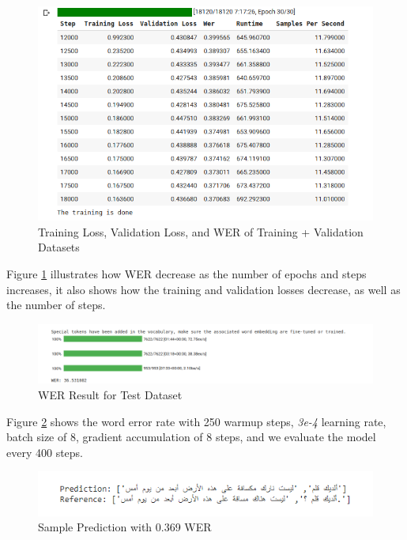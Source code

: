 \documentclass[
  a4paper,
]{article}
\begin{document}
\begin{figure}

{\centering \includegraphics{training_is_done} 

}

\caption{Training Loss, Validation Loss, and WER of Training + Validation Datasets}\label{fig:wer37}
\end{figure}

Figure \ref{fig:wer37} illustrates how WER decrease as the number of
epochs and steps increases, it also shows how the training and
validation losses decrease, as well as the number of steps.

\begin{figure}

{\centering \includegraphics{WER36.53} 

}

\caption{WER Result for Test Dataset}\label{fig:WER36.53}
\end{figure}

Figure \ref{fig:WER36.53} shows the word error rate with 250 warmup
steps, \emph{3e-4} learning rate, batch size of 8, gradient accumulation
of 8 steps, and we evaluate the model every 400 steps.

\begin{figure}

{\centering \includegraphics{sample_prediction} 

}

\caption{Sample Prediction with 0.369 WER}\label{fig:sample_prediction}
\end{figure}
\end{document}
